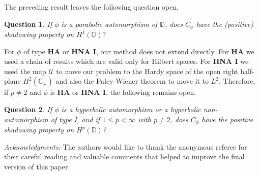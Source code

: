 \documentclass[11pt]{amsart}
\theoremstyle{plain}
\theoremstyle{remark}
\theoremstyle{plain}
\newtheorem{ques}{Question}
\begin{document}
The preceding result leaves the following question open.

\begin{ques}\normalfont
If $\phi$ is a parabolic automorphism of $\mathbb{D}$, does $C_{\phi}$ have the (positive) shadowing property on $H^1(\mathbb{D})?$
\end{ques}

For $\phi$ of type \textbf{HA} or \textbf{HNA I}, our method does not extend directly. For \textbf{HA} we used a chain of results which are valid only for Hilbert spaces. For \textbf{HNA I} we used the map $\mathcal{U}$ to move our problem to the Hardy space of the open right half-plane $H^2(\mathbb{C}_+)$ and also the Paley-Wiener theorem to move it to $L^2$. Therefore, if $p \neq 2$ and $\phi$ is \textbf{HA} or \textbf{HNA I}, the following remains open.

\begin{ques}\normalfont
If $\phi$ is a hyperbolic automorphism or a hyperbolic non-automorphism of type I, and if $1\leq p<\infty$ with $p\neq 2$, does $C_{\phi}$ have the positive shadowing property on $H^p(\mathbb{D})$?
\end{ques}

\vspace{0.3cm}

 \textit{Acknowledgments:} The authors would like to thank the anonymous referee for their careful reading and valuable comments that helped to improve the final version of this paper.


\printbibliography
\end{document}
